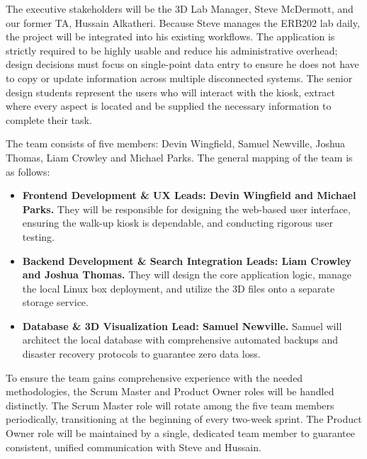 The executive stakeholders will be the 3D Lab Manager, Steve McDermott, and our former TA, Hussain Alkatheri. Because Steve manages the ERB202 lab daily, the project will be integrated into his existing workflows. The application is strictly required to be highly usable and reduce his administrative overhead; design decisions must focus on single-point data entry to ensure he does not have to copy or update information across multiple disconnected systems. The senior design students represent the users who will interact with the kiosk, extract where every aspect is located and be supplied the necessary information to complete their task.

The team consists of five members: Devin Wingfield, Samuel Newville, Joshua Thomas, Liam Crowley and Michael Parks. The general mapping of the team is as follows:

\begin{itemize}
    \item \textbf{Frontend Development \& UX Leads: Devin Wingfield and Michael Parks.} They will be  responsible for designing the web-based user interface, ensuring the walk-up kiosk is dependable, and conducting rigorous user testing.
    
    \item \textbf{Backend Development \& Search Integration Leads: Liam Crowley and Joshua Thomas.} They will design the core application logic, manage the local Linux box deployment, and utilize the 3D files onto a separate storage service.
    
    \item \textbf{Database \& 3D Visualization Lead: Samuel Newville.} Samuel will architect the local database with comprehensive automated backups and disaster recovery protocols to guarantee zero data loss.
\end{itemize}

To ensure the team gains comprehensive experience with the needed methodologies, the Scrum Master and Product Owner roles will be handled distinctly. The Scrum Master role will rotate among the five team members periodically, transitioning at the beginning of every two-week sprint. The Product Owner role will be maintained by a single, dedicated team member to guarantee consistent, unified communication with Steve and Hussain.